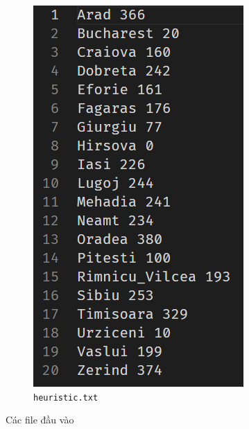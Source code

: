 \documentclass[a4paper, 11pt]{article}
\begin{document}
\begin{figure}[h]
\begin{subfigure}[b]{0.3\textwidth}
    \includegraphics[width=\textwidth,height=\textheight,keepaspectratio]{heuristic.png}
    \caption{\lstinline|heuristic.txt| }
  \end{subfigure}
  \caption{Các file đầu vào}
\end{figure}
\end{document}
